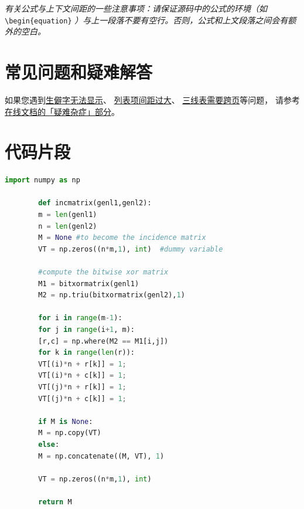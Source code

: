 \textit{有关公式与上下文间距的一些注意事项：请保证源码中的公式的环境（如}
\\ \verb|\begin{equation}|
	\textit{）与上一段落不要有空行。否则，公式和上文段落之间会有额外的空白。}
	
	
	\section{常见问题和疑难解答}
	
	如果您遇到\href{https://bithesis.bitnp.net/faq/char-missing.html}{生僻字无法显示}、
	\href{https://bithesis.bitnp.net/faq/enumitem-nosep.html}{列表项间距过大}、
	\href{https://bithesis.bitnp.net/faq/longtable.html}{三线表需要跨页}等问题，
	请参考\textcolor{magenta}{\href{https://bithesis.bitnp.net/faq/}{在线文档的「疑难杂症」部分}}。
	
	\section{代码片段}
	
	\begin{lstlisting}[language=Python, caption={Python Code}, label={lst:pythonfile}]
		import numpy as np
		
		def incmatrix(genl1,genl2):
		m = len(genl1)
		n = len(genl2)
		M = None #to become the incidence matrix
		VT = np.zeros((n*m,1), int)  #dummy variable
		
		#compute the bitwise xor matrix
		M1 = bitxormatrix(genl1)
		M2 = np.triu(bitxormatrix(genl2),1)
		
		for i in range(m-1):
		for j in range(i+1, m):
		[r,c] = np.where(M2 == M1[i,j])
		for k in range(len(r)):
		VT[(i)*n + r[k]] = 1;
		VT[(i)*n + c[k]] = 1;
		VT[(j)*n + r[k]] = 1;
		VT[(j)*n + c[k]] = 1;
		
		if M is None:
		M = np.copy(VT)
		else:
		M = np.concatenate((M, VT), 1)
		
		VT = np.zeros((n*m,1), int)
		
		return M
	\end{lstlisting}

